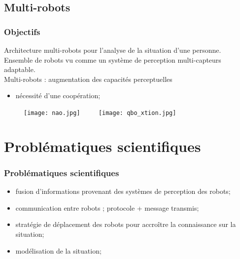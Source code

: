\documentclass[usepdftitle=false, xcolor=dvipsnames, 12, c]{beamer} %
\begin{document}
\subsection{Multi-robots}
\begin{frame}[label=objMultirobots, t]
\frametitle{Objectifs}
    Architecture multi-robots pour l'analyse de la situation d'une personne.\\
    Ensemble de robots vu comme un système de perception multi-capteurs adaptable.\\
    \vspace{1em}
    Multi-robots : augmentation des capacités perceptuelles
    \begin{itemize}
        \item[] nécessité d'une coopération;
    \end{itemize}
    \begin{figure}[p]
        \texttt{[image: nao.jpg]} ~~~~ \texttt{[image: qbo\_xtion.jpg]}
    \end{figure}
\end{frame}

\section{Problématiques scientifiques}
\begin{frame}[label=pbScientifiques]
\frametitle{Problématiques scientifiques}
\begin{itemize}
    \item fusion d'informations provenant des systèmes de perception des robots;
    \item communication entre robots ; protocole + message transmis;
    \item stratégie de déplacement des robots pour accroître la connaissance sur la situation;
    \item modélisation de la situation;
\end{itemize}
\end{frame}
\end{document}
